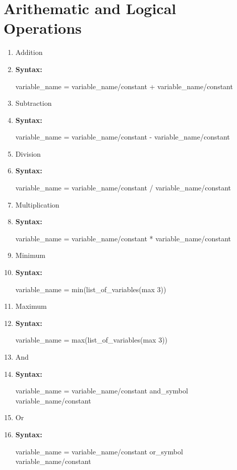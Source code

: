 \documentclass{scrreprt}
\begin{document}
\section{Arithematic and Logical Operations}
\begin{enumerate}
\item Addition
\item[] \textbf{Syntax:}\\
\begin{center}
variable_name = variable_name/constant + variable_name/constant
\end{center}

\item Subtraction
\item[] \textbf{Syntax:}\\
\begin{center}
variable_name = variable_name/constant - variable_name/constant
\end{center}

\item Division
\item[] \textbf{Syntax:}\\
\begin{center}
variable_name = variable_name/constant / variable_name/constant
\end{center}

\item Multiplication
\item[] \textbf{Syntax:}\\
\begin{center}
variable_name = variable_name/constant * variable_name/constant
\end{center}

\item Minimum
\item[] \textbf{Syntax:}\\
\begin{center}
variable_name = min({list_of_variables(max 3)})
\end{center}

\item Maximum
\item[] \textbf{Syntax:}\\
\begin{center}
variable_name = max({list_of_variables(max 3)})
\end{center}

\item And
\item[] \textbf{Syntax:}\\
\begin{center}
variable_name = variable_name/constant and_symbol variable_name/constant
\end{center}

\item Or
\item[] \textbf{Syntax:}\\
\begin{center}
variable_name = variable_name/constant or_symbol variable_name/constant
\end{center}
\end{enumerate}
\end{document}
